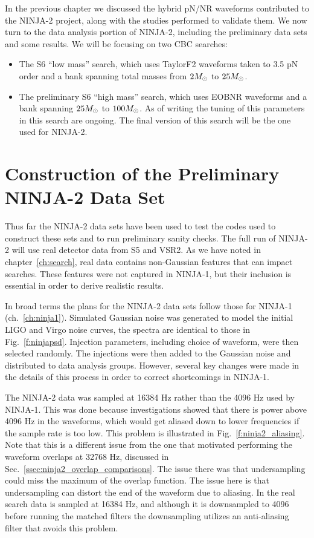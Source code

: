 In the previous chapter we discussed the hybrid pN/NR waveforms
contributed to the NINJA-2 project, along with the studies performed
to validate them.  We now turn to the data analysis portion of
NINJA-2, including the preliminary data sets and some results.  We
will be focusing on two CBC searches:
\begin{itemize}
\item The S6 ``low mass'' search, which uses TaylorF2 waveforms taken to
3.5 pN order and a bank spanning total masses from $2M_\odot$ to
$25M_\odot$.
\item The preliminary S6 ``high mass'' search, which uses EOBNR 
waveforms and a bank spanning $25M_\odot$ to $100M_\odot$.  As of writing
the tuning of this parameters in this search are ongoing.  The final
version of this search will be the one used for NINJA-2.
\end{itemize}

\section{Construction of the Preliminary NINJA-2 Data Set}

Thus far the NINJA-2 data sets have been used to test the codes used
to construct these sets and to run preliminary sanity checks.  The
full run of NINJA-2 will use real detector data from S5 and VSR2.  As
we have noted in chapter~\ref{ch:search}, real data contains
non-Gaussian features that can impact searches.  These features were
not captured in NINJA-1, but their inclusion is essential in order to
derive realistic results.

In broad terms the plans for the NINJA-2 data sets follow those for
NINJA-1 (ch.~\ref{ch:ninja1}).  Simulated Gaussian noise was generated
to model the initial LIGO and Virgo noise curves, the spectra are
identical to those in Fig.~\ref{f:ninjapsd}.  Injection parameters,
including choice of waveform, were then selected randomly.  The
injections were then added to the Gaussian noise and distributed to
data analysis groups.  However, several key changes were made in the
details of this process in order to correct shortcomings in NINJA-1.  

The NINJA-2 data was sampled at 16384 Hz rather than the 4096 Hz used
by NINJA-1.  This was done because investigations showed that there is
power above 4096 Hz in the waveforms, which would get aliased down to
lower frequencies if the sample rate is too low.  This problem is
illustrated in Fig.~\ref{f:ninja2_aliasing}.  Note that this is a
different issue from the one that motivated performing the waveform
overlaps at 32768 Hz, discussed in
Sec.~\ref{ssec:ninja2_overlap_comparisons}.  The issue there was
that undersampling could miss the maximum of the overlap function.
The issue here is that undersampling can distort the end of the
waveform due to aliasing.   In the real search data is sampled at
16384 Hz, and although it is downsampled to 4096 before running the
matched filters the downsampling utilizes an anti-aliasing filter that
avoids this problem. 

